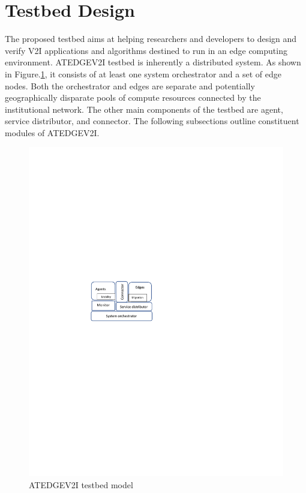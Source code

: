 \documentclass[conference]{IEEEtran}
\begin{document}
\section{Testbed Design}
\par The proposed testbed aims at helping researchers and developers to design and verify
V2I applications and algorithms destined to run in an edge computing environment. ATEDGEV2I testbed is inherently a distributed system. As shown in Figure.\ref{fig:model}, it consists of at least one system orchestrator
and a set of edge nodes. Both the orchestrator and edges are separate and potentially geographically disparate pools of
compute resources connected by the institutional network. The other main components of the testbed are agent, service distributor, and connector. The following subsections outline constituent modules of ATEDGEV2I.
\begin{figure}[!htbp]
\centering
\includegraphics[clip, trim=3cm 13.0cm 9.5cm 11.2cm, width=\columnwidth]{figures/model5.pdf}
\caption{ATEDGEV2I testbed model}
\label{fig:model}
\end{figure}
\end{document}
